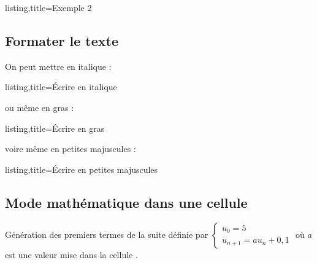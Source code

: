 \documentclass[a4paper,french]{article}
\begin{document}
\medskip

\begin{tcblisting}{listing,title=Exemple 2}
\end{tcblisting}

\subsection{Formater le texte}

On peut mettre en italique :

\medskip

\begin{tcblisting}{listing,title=\'Ecrire en italique}
\end{tcblisting}

\medskip

ou m\^eme en gras :

\medskip

\begin{tcblisting}{listing,title=\'Ecrire en gras}
\end{tcblisting}

voire m\^eme en petites majuscules :

\medskip

\begin{tcblisting}{listing,title=\'Ecrire en petites majuscules}
\end{tcblisting}

\subsection{Mode math\'ematique dans une cellule}

G\'en\'eration des premiers termes de la suite d\'efinie par $\left\{\begin{array}{l}
u_0=5\\
u_{n+1}=au_n+0,1
\end{array}
\right.$ o\`u $a$ est une valeur mise dans la cellule .
\end{document}
